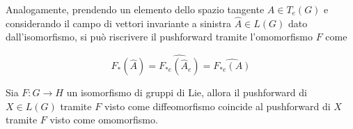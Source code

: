 Analogamente, prendendo un elemento dello spazio tangente $ A \in T_{e}(G) $ e considerando il campo di vettori invariante a sinistra $ \hat{A} \in L(G) $ dato dall'isomorfismo, si può riscrivere il pushforward tramite l'omomorfismo $ F $ come

\begin{equation}
	F_{*} (\hat{A}) = \widehat{ F_{*e} (\hat{A}_{e}) } = \widehat{ F_{*e} (A) }
\end{equation}

\begin{definition}
	Sia $ F : G \to H $ un isomorfismo di gruppi di Lie, allora il pushforward di $ X \in L(G) $ tramite $ F $ visto come diffeomorfismo coincide al pushforward di $ X $ tramite $ F $ visto come omomorfismo.
\end{definition}

